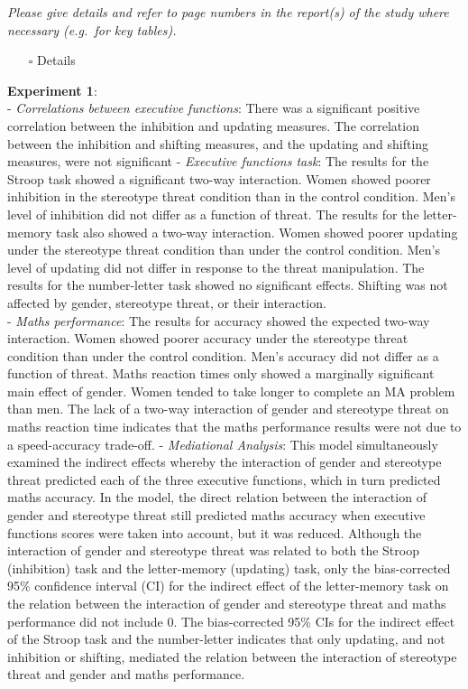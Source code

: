 \documentclass[
  doc, a4paper]{apa7}
\providecommand{\tightlist}{%
  \setlength{\itemsep}{0pt}\setlength{\parskip}{0pt}}
\begin{document}
\emph{Please give details and refer to page numbers in the report(s) of the study where necessary (e.g.~for key tables).}

\begin{itemize}
\tightlist
\item[$\square$]
  Details
\end{itemize}

\textbf{Experiment 1}:\\
- \emph{Correlations between executive functions}: There was a significant positive correlation between the inhibition and updating measures. The correlation between the inhibition and shifting measures, and the updating and shifting measures, were not significant
- \emph{Executive functions task}: The results for the Stroop task showed a significant two-way interaction. Women showed poorer inhibition in the stereotype threat condition than in the control condition. Men's level of inhibition did not differ as a function of threat. The results for the letter-memory task also showed a two-way interaction. Women showed poorer updating under the stereotype threat condition than under the control condition. Men's level of updating did not differ in response to the threat manipulation. The results for the number-letter task showed no significant effects. Shifting was not affected by gender, stereotype threat, or their interaction.\\
- \emph{Maths performance}: The results for accuracy showed the expected two-way interaction. Women showed poorer accuracy under the stereotype threat condition than under the control condition. Men's accuracy did not differ as a function of threat. Maths reaction times only showed a marginally significant main effect of gender. Women tended to take longer to complete an MA problem than men. The lack of a two-way interaction of gender and stereotype threat on maths reaction time indicates that the maths performance results were not due to a speed-accuracy trade-off.
- \emph{Mediational Analysis}: This model simultaneously examined the indirect effects whereby the interaction of gender and stereotype threat predicted each of the three executive functions, which in turn predicted maths accuracy. In the model, the direct relation between the interaction of gender and stereotype threat still predicted maths accuracy when executive functions scores were taken into account, but it was reduced. Although the interaction of gender and stereotype threat was related to both the Stroop (inhibition) task and the letter-memory (updating) task, only the bias-corrected 95\% confidence interval (CI) for the indirect effect of the letter-memory task on the relation between the interaction of gender and stereotype threat and maths performance did not include 0. The bias-corrected 95\% CIs for the indirect effect of the Stroop task and the number-letter indicates that only updating, and not inhibition or shifting, mediated the relation between the interaction of stereotype threat and gender and maths performance.
\end{document}
